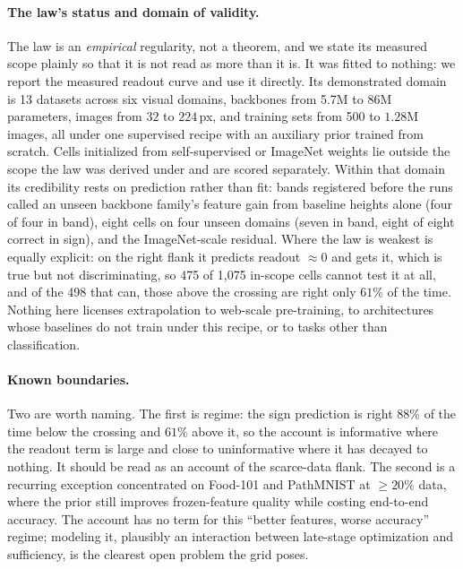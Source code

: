 \paragraph{The law's status and domain of validity.} The law is an
\emph{empirical} regularity, not a theorem, and we state its measured scope
plainly so that it is not read as more than it is. It was fitted to nothing:
we report the measured readout curve and use it directly. Its demonstrated
domain is 13 datasets across six visual domains, backbones from 5.7M to 86M
parameters, images from $32$ to $224$\,px, and training sets from 500 to
$1.28$M images, all under one supervised recipe with an auxiliary prior
trained from scratch. Cells initialized from self-supervised or ImageNet
weights lie outside the scope the law was derived under and are scored
separately. Within that domain its credibility rests on prediction rather
than fit: bands registered before the runs called an unseen backbone
family's feature gain from baseline heights alone (four of four in band),
eight cells on four unseen domains (seven in band, eight of eight correct in
sign), and the ImageNet-scale residual. Where the law is weakest is equally
explicit: on the right flank it predicts readout ${\approx}0$ and gets it,
which is true but not discriminating, so 475 of 1{,}075 in-scope cells
cannot test it at all, and of the 498 that can, those above the crossing
are right only $61\%$ of the time. Nothing here licenses
extrapolation to web-scale pre-training, to architectures whose baselines do
not train under this recipe, or to tasks other than classification.

\paragraph{Known boundaries.} Two are worth naming. The first is
regime: the sign prediction is right $88\%$ of the time below the crossing
and $61\%$ above it, so the account is informative where the readout term
is large and close to uninformative where it has decayed to nothing. It
should be read as an account of the scarce-data flank. The second is a
recurring exception concentrated on Food-101 and PathMNIST at
${\geq}20\%$ data, where the prior still improves frozen-feature quality
while costing end-to-end accuracy. The account has no term
for this ``better features, worse accuracy'' regime; modeling it,
plausibly an interaction between late-stage optimization and
sufficiency, is the clearest open problem the grid poses.

